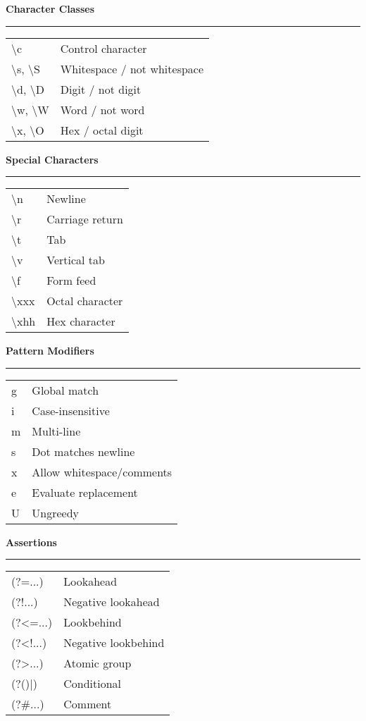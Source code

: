 \documentclass[10pt]{article}
\newcommand{\cheatsection}[1]{%
  \vspace{1em}
  {\large\color{headercolor}\textbf{#1}}\par
  \vspace{0.3em}
  \hrule
  \vspace{0.5em}
}
\begin{document}
\begin{multicols}{2}
\cheatsection{Character Classes}
\begin{tabular}{>{\ttfamily}ll}
\textbackslash c & Control character \\
\textbackslash s, \textbackslash S & Whitespace / not whitespace \\
\textbackslash d, \textbackslash D & Digit / not digit \\
\textbackslash w, \textbackslash W & Word / not word \\
\textbackslash x, \textbackslash O & Hex / octal digit \\
\end{tabular}

\cheatsection{Special Characters}
\begin{tabular}{>{\ttfamily}ll}
\textbackslash n & Newline \\
\textbackslash r & Carriage return \\
\textbackslash t & Tab \\
\textbackslash v & Vertical tab \\
\textbackslash f & Form feed \\
\textbackslash xxx & Octal character \\
\textbackslash xhh & Hex character \\
\end{tabular}

\cheatsection{Pattern Modifiers}
\begin{tabular}{>{\ttfamily}ll}
g & Global match \\
i & Case-insensitive \\
m & Multi-line \\
s & Dot matches newline \\
x & Allow whitespace/comments \\
e & Evaluate replacement \\
U & Ungreedy \\
\end{tabular}

\cheatsection{Assertions}
\begin{tabular}{>{\ttfamily}ll}
(?=...) & Lookahead \\
(?!...) & Negative lookahead \\
(?<=...) & Lookbehind \\
(?<!...) & Negative lookbehind \\
(?>...) & Atomic group \\
(?()|) & Conditional \\
(?#...) & Comment \\
\end{tabular}


\end{multicols}
\end{document}

